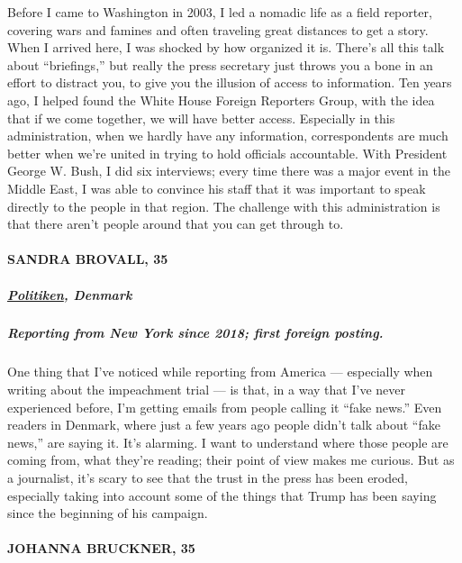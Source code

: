 Before I came to Washington in 2003, I led a nomadic life as a field
reporter, covering wars and famines and often traveling great distances
to get a story. When I arrived here, I was shocked by how organized it
is. There's all this talk about ``briefings,'' but really the press
secretary just throws you a bone in an effort to distract you, to give
you the illusion of access to information. Ten years ago, I helped found
the White House Foreign Reporters Group, with the idea that if we come
together, we will have better access. Especially in this administration,
when we hardly have any information, correspondents are much better when
we're united in trying to hold officials accountable. With President
George W. Bush, I did six interviews; every time there was a major event
in the Middle East, I was able to convince his staff that it was
important to speak directly to the people in that region. The challenge
with this administration is that there aren't people around that you can
get through to.

\hypertarget{sandra-brovall-35}{%
\paragraph{SANDRA BROVALL, 35}\label{sandra-brovall-35}}

\hypertarget{politiken-denmark}{%
\subparagraph{\texorpdfstring{\textbf{\href{https://politiken.dk/}{Politiken},
Denmark}}{Politiken, Denmark}}\label{politiken-denmark}}

\hypertarget{reporting-from-new-york-since-2018-first-foreign-posting}{%
\subparagraph{\texorpdfstring{\textbf{Reporting from New York since
2018; first foreign
posting.}}{Reporting from New York since 2018; first foreign posting.}}\label{reporting-from-new-york-since-2018-first-foreign-posting}}

One thing that I've noticed while reporting from America --- especially
when writing about the impeachment trial --- is that, in a way that I've
never experienced before, I'm getting emails from people calling it
``fake news.'' Even readers in Denmark, where just a few years ago
people didn't talk about ``fake news,'' are saying it. It's alarming. I
want to understand where those people are coming from, what they're
reading; their point of view makes me curious. But as a journalist, it's
scary to see that the trust in the press has been eroded, especially
taking into account some of the things that Trump has been saying since
the beginning of his campaign.

\hypertarget{johanna-bruckner-35}{%
\paragraph{JOHANNA BRUCKNER, 35}\label{johanna-bruckner-35}}

